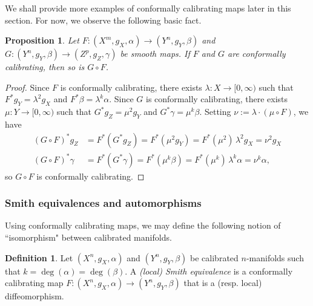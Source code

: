 \documentclass[11pt]{article}
\newtheorem{prop}[thm]{Proposition}
\theoremstyle{definition}
\newtheorem{defn}[thm]{Definition}
\numberwithin{equation}{section}
\begin{document}
\indent We shall provide more examples of conformally calibrating maps later in this section.  For now, we observe the following basic fact.


\begin{prop} \label{prop:Composition} Let $F \colon (X^m, g_X, \alpha) \to (Y^n, g_Y, \beta)$ and $G \colon (Y^n, g_Y, \beta) \to (Z^p, g_Z, \gamma)$ be smooth maps.  If $F$ and $G$ are conformally calibrating, then so is $G \circ F$.
\end{prop}

\begin{proof} Since $F$ is conformally calibrating, there exists $\lambda \colon X \to [0,\infty)$ such that $F^*g_Y = \lambda^2g_X$ and $F^*\beta = \lambda^k \alpha$.  Since $G$ is conformally calibrating, there exists $\mu \colon Y \to [0,\infty)$ such that $G^*g_Z = \mu^2 g_Y$ and $G^*\gamma = \mu^k \beta$.  Setting $\nu := \lambda \cdot (\mu \circ F)$, we have
\begin{align*}
(G \circ F)^*g_Z & = F^*(G^*g_Z) = F^*(\mu^2 g_Y) = F^*(\mu^2)\,\lambda^2 g_X = \nu^2 g_X \\
(G \circ F)^*\gamma & = F^*(G^*\gamma) = F^*(\mu^k \beta) = F^*(\mu^k)\,\lambda^k \alpha = \nu^k \alpha,
\end{align*}
so $G \circ F$ is conformally calibrating.
\end{proof}

\subsubsection{Smith equivalences and automorphisms}


\indent \indent Using conformally calibrating maps, we may define the following notion of ``isomorphism" between calibrated manifolds.

\begin{defn} Let $(X^n, g_X, \alpha)$ and $(Y^n, g_Y, \beta)$ be calibrated $n$-manifolds such that $k = \deg(\alpha) = \deg(\beta)$.  A \emph{(local) Smith equivalence} is a conformally calibrating map $F \colon (X^n, g_X, \alpha) \to (Y^n, g_Y, \beta)$ that is a (resp. local) diffeomorphism.
\end{defn}
\end{document}
